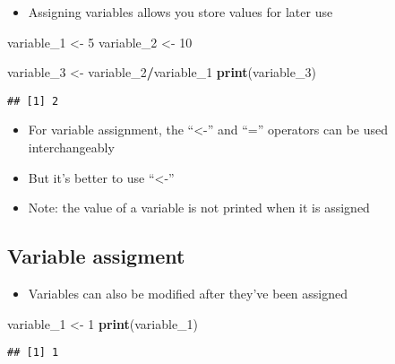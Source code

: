 \documentclass[]{article}
\newenvironment{Shaded}{\begin{snugshade}}{\end{snugshade}}
\newcommand{\KeywordTok}[1]{\textcolor[rgb]{0.13,0.29,0.53}{\textbf{#1}}}
\newcommand{\DecValTok}[1]{\textcolor[rgb]{0.00,0.00,0.81}{#1}}
\newcommand{\StringTok}[1]{\textcolor[rgb]{0.31,0.60,0.02}{#1}}
\newcommand{\OperatorTok}[1]{\textcolor[rgb]{0.81,0.36,0.00}{\textbf{#1}}}
\newcommand{\NormalTok}[1]{#1}
\providecommand{\tightlist}{%
  \setlength{\itemsep}{0pt}\setlength{\parskip}{0pt}}
\begin{document}
\begin{itemize}
\tightlist
\item
  Assigning variables allows you store values for later use
\end{itemize}

\begin{Shaded}
\begin{Highlighting}[]
\NormalTok{variable_}\DecValTok{1}\NormalTok{ <-}\StringTok{ }\DecValTok{5}
\NormalTok{variable_}\DecValTok{2}\NormalTok{ <-}\StringTok{ }\DecValTok{10}

\NormalTok{variable_}\DecValTok{3}\NormalTok{ <-}\StringTok{ }\NormalTok{variable_}\DecValTok{2}\OperatorTok{/}\NormalTok{variable_}\DecValTok{1}
\KeywordTok{print}\NormalTok{(variable_}\DecValTok{3}\NormalTok{)}
\end{Highlighting}
\end{Shaded}

\begin{verbatim}
## [1] 2
\end{verbatim}

\begin{itemize}
\tightlist
\item
  For variable assignment, the ``\textless{}-'' and ``='' operators can
  be used interchangeably
\item
  But it's better to use ``\textless{}-''
\item
  Note: the value of a variable is not printed when it is assigned
\end{itemize}

\subsection{Variable assigment}\label{variable-assigment}

\begin{itemize}
\tightlist
\item
  Variables can also be modified after they've been assigned
\end{itemize}

\begin{Shaded}
\begin{Highlighting}[]
\NormalTok{variable_}\DecValTok{1}\NormalTok{ <-}\StringTok{ }\DecValTok{1}
\KeywordTok{print}\NormalTok{(variable_}\DecValTok{1}\NormalTok{)}
\end{Highlighting}
\end{Shaded}

\begin{verbatim}
## [1] 1
\end{verbatim}
\end{document}
